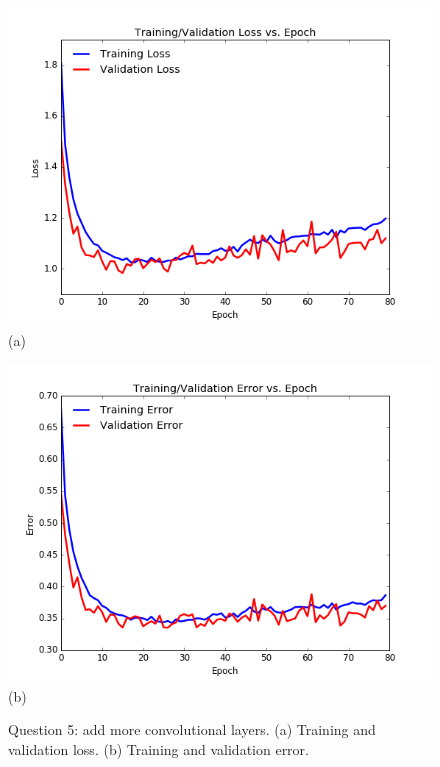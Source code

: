 \documentclass[paper=a4, fontsize=11pt]{scrartcl}
\begin{document}
\begin{figure}
\centering
\centering
 \begin{minipage}{.5\columnwidth}
\centering
  	\includegraphics[width=1\linewidth]{question5a_loss.png}
  	\footnotesize{(a)}
 \end{minipage}\hfill%
\centering
 \begin{minipage}{.5\columnwidth}
\centering
  	\includegraphics[width=1\columnwidth]{question5a_error.png}
  	\footnotesize{(b)}
 \end{minipage}\hfill%
\caption{Question 5: add more convolutional layers. (a) Training and validation loss. (b) Training and validation error.}
\label{fig:question5a}
\end{figure}
\end{document}
